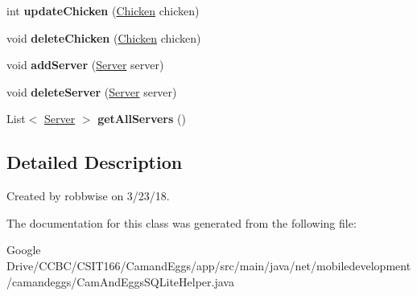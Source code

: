 \begin{DoxyCompactItemize}
\item 
\mbox{\label{classnet_1_1mobiledevelopment_1_1camandeggs_1_1_cam_and_eggs_s_q_lite_helper_a2c719648254dd1e4471545ea356d32fd}} 
int {\bfseries update\+Chicken} (\hyperlink{classnet_1_1mobiledevelopment_1_1camandeggs_1_1_chicken}{Chicken} chicken)
\item 
\mbox{\label{classnet_1_1mobiledevelopment_1_1camandeggs_1_1_cam_and_eggs_s_q_lite_helper_abfdf570911ef701c2005ca8a3a865dd3}} 
void {\bfseries delete\+Chicken} (\hyperlink{classnet_1_1mobiledevelopment_1_1camandeggs_1_1_chicken}{Chicken} chicken)
\item 
\mbox{\label{classnet_1_1mobiledevelopment_1_1camandeggs_1_1_cam_and_eggs_s_q_lite_helper_af6851e0163f138614c7d6fd05b402c1f}} 
void {\bfseries add\+Server} (\hyperlink{classnet_1_1mobiledevelopment_1_1camandeggs_1_1_server}{Server} server)
\item 
\mbox{\label{classnet_1_1mobiledevelopment_1_1camandeggs_1_1_cam_and_eggs_s_q_lite_helper_a1ba1a380310fa7badb1aec6bc15dd981}} 
void {\bfseries delete\+Server} (\hyperlink{classnet_1_1mobiledevelopment_1_1camandeggs_1_1_server}{Server} server)
\item 
\mbox{\label{classnet_1_1mobiledevelopment_1_1camandeggs_1_1_cam_and_eggs_s_q_lite_helper_ac8a255e4f36bd86f3c1db8d5bcedfde4}} 
List$<$ \hyperlink{classnet_1_1mobiledevelopment_1_1camandeggs_1_1_server}{Server} $>$ {\bfseries get\+All\+Servers} ()
\end{DoxyCompactItemize}


\subsection{Detailed Description}
Created by robbwise on 3/23/18. 

The documentation for this class was generated from the following file\+:\begin{DoxyCompactItemize}
\item 
Google Drive/\+C\+C\+B\+C/\+C\+S\+I\+T166/\+Camand\+Eggs/app/src/main/java/net/mobiledevelopment/camandeggs/Cam\+And\+Eggs\+S\+Q\+Lite\+Helper.\+java\end{DoxyCompactItemize}

